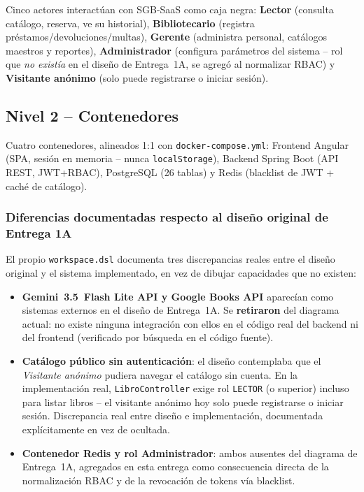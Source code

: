 \documentclass[12pt,a4paper]{article}
\begin{document}
Cinco actores interactúan con SGB-SaaS como caja negra: \textbf{Lector}
(consulta catálogo, reserva, ve su historial), \textbf{Bibliotecario}
(registra préstamos/devoluciones/multas), \textbf{Gerente} (administra
personal, catálogos maestros y reportes), \textbf{Administrador}
(configura parámetros del sistema -- rol que \emph{no existía} en el
diseño de Entrega~1A, se agregó al normalizar RBAC) y
\textbf{Visitante anónimo} (solo puede registrarse o iniciar sesión).

\subsection{Nivel 2 -- Contenedores}

Cuatro contenedores, alineados 1:1 con \texttt{docker-compose.yml}:
Frontend Angular (SPA, sesión en memoria -- nunca \texttt{localStorage}),
Backend Spring Boot (API REST, JWT+RBAC), PostgreSQL (26 tablas) y Redis
(blacklist de JWT + caché de catálogo).

\subsubsection*{Diferencias documentadas respecto al diseño original de Entrega 1A}

El propio \texttt{workspace.dsl} documenta tres discrepancias reales
entre el diseño original y el sistema implementado, en vez de dibujar
capacidades que no existen:

\begin{itemize}[leftmargin=1.2cm]
  \item \textbf{Gemini~3.5~Flash Lite API y Google Books API} aparecían como
    sistemas externos en el diseño de Entrega~1A. Se \textbf{retiraron}
    del diagrama actual: no existe ninguna integración con ellos en el
    código real del backend ni del frontend (verificado por búsqueda en
    el código fuente).
  \item \textbf{Catálogo público sin autenticación}: el diseño
    contemplaba que el \emph{Visitante anónimo} pudiera navegar el
    catálogo sin cuenta. En la implementación real,
    \texttt{LibroController} exige rol \texttt{LECTOR} (o superior)
    incluso para listar libros -- el visitante anónimo hoy solo puede
    registrarse o iniciar sesión. Discrepancia real entre diseño e
    implementación, documentada explícitamente en vez de ocultada.
  \item \textbf{Contenedor Redis y rol Administrador}: ambos ausentes del
    diagrama de Entrega~1A, agregados en esta entrega como consecuencia
    directa de la normalización RBAC y de la revocación de tokens vía
    blacklist.
\end{itemize}
\end{document}
